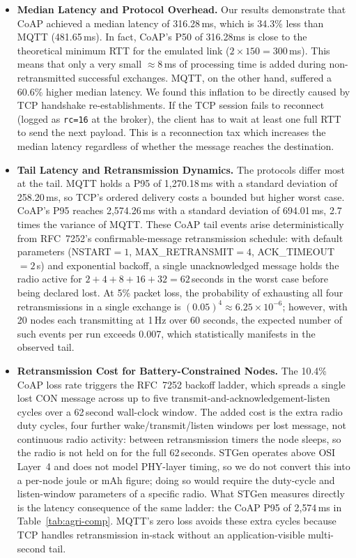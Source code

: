 \documentclass[jsan,article,submit,moreauthors,pdftex]{Definitions/mdpi}
\begin{document}
\begin{itemize}
    \item \textbf{Median Latency and Protocol Overhead.}
    Our results demonstrate that CoAP achieved a median latency of 316.28\,ms, which is 34.3\% less than MQTT (481.65\,ms). In fact, CoAP's P50 of 316.28‌ms is close to the theoretical minimum RTT for the emulated link ($2 \times 150 = 300$\,ms). This means that only a very small $\approx$8\,ms of processing time is added during non-retransmitted successful exchanges. MQTT, on the other hand, suffered a 60.6\% higher median latency. We found this inflation to be directly caused by TCP handshake re-establishments. If the TCP session fails to reconnect (logged as \texttt{rc=16} at the broker), the client has to wait at least one full RTT to send the next payload. This is a reconnection tax which increases the median latency regardless of whether the message reaches the destination.

    \item \textbf{Tail Latency and Retransmission Dynamics.}
    The protocols differ most at the tail. MQTT holds a P95 of 1{,}270.18\,ms with a standard deviation of 258.20\,ms, so TCP's ordered delivery costs a bounded but higher worst case. CoAP's P95 reaches 2{,}574.26\,ms with a standard deviation of 694.01\,ms, 2.7 times the variance of MQTT. These CoAP tail events arise deterministically from RFC~7252's confirmable-message retransmission schedule: with default parameters (NSTART$=1$, MAX\_RETRANSMIT$=4$, ACK\_TIMEOUT$=2$\,s) and exponential backoff, a single unacknowledged message holds the radio active for $2 + 4 + 8 + 16 + 32 = 62$\,seconds in the worst case before being declared lost. At 5\% packet loss, the probability of exhausting all four retransmissions in a single exchange is $(0.05)^4 \approx 6.25 \times 10^{-6}$; however, with 20 nodes each transmitting at 1\,Hz over 60 seconds, the expected number of such events per run exceeds 0.007, which statistically manifests in the observed tail.

    \item \textbf{Retransmission Cost for Battery-Constrained Nodes.}
    The 10.4\% CoAP loss rate triggers the RFC~7252 backoff ladder, which spreads a single lost CON message across up to five transmit-and-acknowledgement-listen cycles over a 62\,second wall-clock window. The added cost is the extra radio duty cycles, four further wake/transmit/listen windows per lost message, not continuous radio activity: between retransmission timers the node sleeps, so the radio is not held on for the full 62\,seconds. STGen operates above OSI Layer~4 and does not model PHY-layer timing, so we do not convert this into a per-node joule or mAh figure; doing so would require the duty-cycle and listen-window parameters of a specific radio. What STGen measures directly is the latency consequence of the same ladder: the CoAP P95 of 2{,}574\,ms in Table~\ref{tab:agri-comp}. MQTT's zero loss avoids these extra cycles because TCP handles retransmission in-stack without an application-visible multi-second tail.


\end{itemize}
\end{document}
